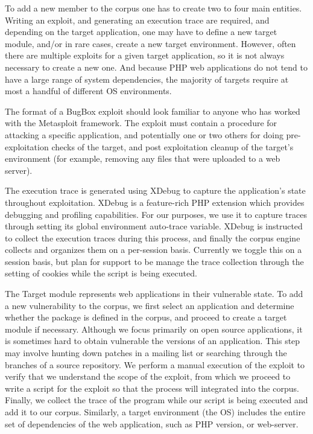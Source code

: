 \documentclass[letterpaper,twocolumn,10pt]{article}
\begin{document}
To add a new member to the corpus one has to create two to four main entities. Writing an exploit, and generating an execution trace are required, and depending on the target application, one may have to define a new target module, and/or in rare cases, create a new target environment. However, often there are multiple exploits for a given target application, so it is not always necessary to create a new one. And because PHP web applications do not tend to have a large range of system dependencies, the majority of targets require at most a handful of different OS environments. \par
The format of a BugBox exploit should look familiar to anyone who has worked with the Metasploit framework. The exploit must contain a procedure for attacking a specific application, and potentially one or two others for doing pre-exploitation checks of the target, and post exploitation cleanup of the target's environment (for example, removing any files that were uploaded to a web server). \par
The execution trace is generated using XDebug to capture the application's state throughout exploitation. XDebug is a feature-rich PHP extension which provides debugging and profiling capabilities.  For our purposes, we use it to capture traces through setting its global environment auto-trace variable. XDebug is instructed to collect the execution traces during this process, and finally the corpus engine collects and organizes them on a per-session basis. Currently we toggle this on a session basis, but plan for support to be manage the trace collection through the setting of cookies while the script is being executed. \par
The Target module represents web applications in their vulnerable state. To add a new vulnerability to the corpus, we first select an application and determine whether the package is defined in the corpus, and proceed to create a target module if necessary. Although we focus primarily on open source applications, it is sometimes hard to obtain vulnerable the versions of an application. This step may involve hunting down patches in a mailing list or searching through the branches of a source repository. We perform a manual execution of the exploit to verify that we understand the scope of the exploit, from which we proceed to write a script for the exploit so that the process will integrated into the corpus. Finally, we collect the trace of the program while our script is being executed and add it to our corpus. Similarly, a target environment (the OS) includes the entire set of dependencies of the web application, such as PHP version, or web-server.\par
\end{document}
